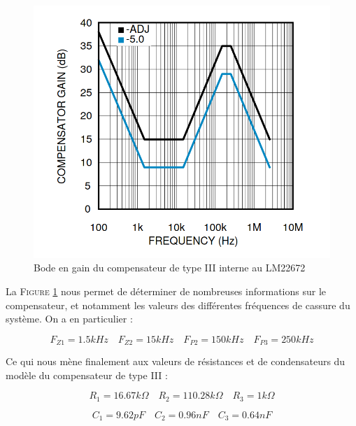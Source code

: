 				\begin{figure}[h]
					\begin{center}
						\includegraphics[scale=0.4]{../Illus/comp_gain.png}
					\end{center}
					\vspace{-2em}
					\caption{Bode en gain du compensateur de type III interne au LM22672 \cite{LM22672}}
					\label{comp_gain}
				\end{figure}
					
				La \textsc{Figure \ref{comp_gain}} nous permet de déterminer de 
				nombreuses informations sur le compensateur, et notamment les 
				valeurs des différentes fréquences de cassure du système. 
				On a en particulier :
										
				\begin{equation}
					F_{Z1} = 1.5kHz
					\quad
					F_{Z2} = 15kHz
					\quad
					F_{P2} = 150kHz
					\quad
					F_{P3} = 250kHz 
				\end{equation}
				
				Ce qui nous mène finalement aux valeurs de résistances 
				et de condensateurs du modèle du compensateur de type III :
				
				\begin{equation}
				R_1 = 16.67k\Omega
				\quad
				R_2 = 110.28k\Omega
				\quad
				R_3 = 1k\Omega
				\end{equation}
				
				\begin{equation}
				C_1 = 9.62pF
				\quad
				C_2 = 0.96nF
				\quad
				C_3 = 0.64nF
				\end{equation}
					
